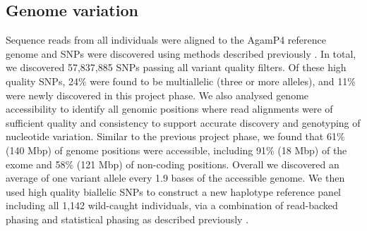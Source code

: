 \documentclass[a4paper,11pt,abstracton,hidelinks]{scrartcl}
\begin{document}
%


\subsection*{Genome variation}


%
Sequence reads from all individuals were aligned to the AgamP4 reference genome \cite{Holt2002, sharakhova2007update} and SNPs were discovered using methods described previously \cite{Ag1000gConsortium2017}.
%
In total, we discovered 57,837,885 SNPs passing all variant quality filters. 
%
Of these high quality SNPs, 24\% were found to be multiallelic (three or more alleles), and 11\% were newly discovered in this project phase.
%
We also analysed genome accessibility to identify all genomic positions where read alignments were of sufficient quality and consistency to support accurate discovery and genotyping of nucleotide variation.
%
Similar to the previous project phase, we found that 61\% (140 Mbp) of genome positions were accessible, including 91\% (18 Mbp) of the exome and 58\% (121 Mbp) of non-coding positions.
%
Overall we discovered an average of one variant allele every 1.9 bases of the accessible genome.
%
We then used high quality biallelic SNPs to construct a new haplotype reference panel including all 1,142 wild-caught individuals, via a combination of read-backed phasing and statistical phasing as described previously \cite{Ag1000gConsortium2017}. 
\end{document}
